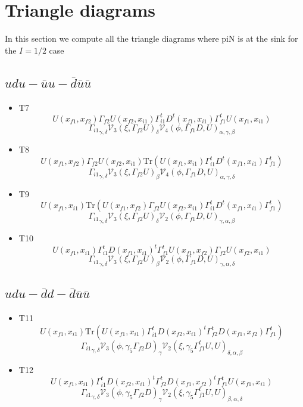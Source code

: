 \documentclass{article}[12pt]
\begin{document}
\section{Triangle diagrams}
In this section we compute all the triangle diagrams where piN is at the sink for the $I=1/2$ case
\subsection{$udu-\bar{u}u-\bar{d}\bar{u}\bar{u}$}
\begin{itemize}
\item T7
$$U(x_{f1},x_{f2})\Gamma_{f2} U(x_{f2},x_{i1})\Gamma_{i1}^tD^t(x_{f1},x_{i1})\Gamma_{f1}^tU(x_{f1},x_{i1})$$
$${\Gamma_{i1}}_{\gamma,\delta}{\mathcal V}_3\left(\xi, \Gamma_{f2}U\right)_{\delta}{\mathcal V}_4\left(\phi,\Gamma_{f1}D,U\right)_{\alpha,\gamma,\beta}$$
\item T8
$$U(x_{f1},x_{f2})\Gamma_{f2} U(x_{f2},x_{i1})\mathrm{Tr}\left(U(x_{f1},x_{i1})\Gamma_{i1}^tD^t(x_{f1},x_{i1})\Gamma_{f1}^t\right)$$
$${\Gamma_{i1}}_{\gamma,\delta}{\mathcal V}_3\left(\xi, \Gamma_{f2}U\right)_{\beta}{\mathcal V}_4\left(\phi,\Gamma_{f1}D,U\right)_{\alpha,\gamma,\delta}$$
\item T9
$$U(x_{f1},x_{i1})\mathrm{Tr} \left(U(x_{f1},x_{f2})\Gamma_{f2}U(x_{f2},x_{i1})\Gamma_{i1}^tD^t(x_{f1},x_{i1})\Gamma_{f1}^t\right)$$
$${\Gamma_{i1}}_{\gamma,\delta}{\mathcal V}_3\left(\xi, \Gamma_{f2}U\right)_{\delta}{\mathcal V}_2\left(\phi,\Gamma_{f1}D,U\right)_{\gamma,\alpha,\beta}$$
\item T10
$$U(x_{f1},x_{i1})\Gamma_{i1}^t D(x_{f1},x_{i1})^t\Gamma_{f1}^tU(x_{f1},x_{f2})\Gamma_{f2}U(x_{f2},x_{i1})$$
$${\Gamma_{i1}}_{\gamma,\delta}{\mathcal V}_3\left(\xi, \Gamma_{f2}U\right)_{\beta}{\mathcal V}_2\left(\phi,\Gamma_{f1}D,U\right)_{\gamma,\alpha,\delta}$$
\end{itemize}
\subsection{$udu-\bar{d}d-\bar{d}\bar{u}\bar{u}$}
\begin{itemize}
\item T11
$$U(x_{f1},x_{i1})\mathrm{Tr}\left(U(x_{f1},x_{i1})\Gamma_{i1}^tD(x_{f2},x_{i1})^t\Gamma_{f2}^tD(x_{f1},x_{f2})\Gamma_{f1}^t\right)$$
$${\Gamma_{i1}}_{\gamma,\delta}{\mathcal V}_3\left(\phi,\gamma_5 \Gamma_{f2}D\right)_{\gamma}{\mathcal V}_2\left(\xi,\gamma_5\Gamma_{f1}^tU,U\right)_{\delta,\alpha,\beta}$$
\item T12
$$U(x_{f1},x_{i1})\Gamma_{i1}^tD(x_{f2},x_{i1})^t\Gamma_{f2}^tD(x_{f1},x_{f2})^t\Gamma_{f1}^tU(x_{f1},x_{i1})$$
$${\Gamma_{i1}}_{\gamma,\delta}{\mathcal V}_3\left(\phi,\gamma_5 \Gamma_{f2}D\right)_{\gamma}{\mathcal V}_2\left(\xi,\gamma_5\Gamma_{f1}^tU,U\right)_{\beta,\alpha,\delta}$$
\end{itemize}
\end{document}
